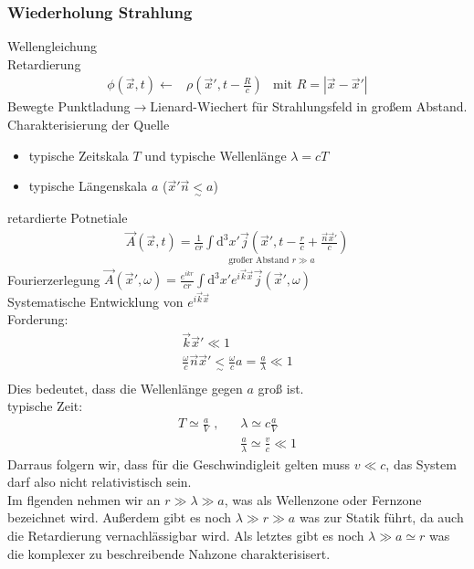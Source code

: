 \documentclass[a4paper]{article}
\newcommand{\intd}{\int\!\mathrm{d}}
\begin{document}
\subsubsection{Wiederholung Strahlung}
Wellengleichung\\
Retardierung
\begin{align}
\phi(\vec{x},t)\longleftarrow&\rho(\vec{x}',t-\frac{R}{c})
&\text{mit }R=|\vec{x}-\vec{x}'| 
\end{align}
Bewegte Punktladung$\rightarrow$Lienard-Wiechert für Strahlungsfeld in großem
Abstand.\\
Charakterisierung der Quelle\\
\begin{itemize}
  \item typische Zeitskala $T$ und typische Wellenlänge $\lambda=cT$
  \item typische Längenskala $a$ ($\vec{x}'\vec{n}\underset{\sim}{<}a$)
\end{itemize}
retardierte Potnetiale
\begin{align}
\vec{A}(\vec{x},t)=\underset{\text{großer Abstand } r\gg a}{
\frac{1}{cr}\intd^3x'
\vec{j}(\vec{x}',t-\frac{r}{c}+\frac{\vec{n}\vec{x}'}{c})} 
\end{align}
Fourierzerlegung
$\vec{A}(\vec{x}',\omega)=\frac{e^{ikr}}{cr}\intd^3x'e^{i\vec{k}\vec{x}}\vec{j}(\vec{x}',\omega)$\\
Systematische Entwicklung von $e^{i\vec{k}\vec{x}}$\\
Forderung: \begin{align}
\vec{k}\vec{x}'\ll1\\
\frac{\omega}{c}\vec{n}\vec{x}'\underset{\sim}{<}\frac{\omega}{c}a=\frac{a}{\lambda}\ll1\\
\end{align}
Dies bedeutet, dass die Wellenlänge gegen $a$ groß ist.\\
typische Zeit:
\begin{align}
T\simeq \frac{a}{V}\text{ , }\ \ \ &\lambda\simeq c\frac{a}{V}\\
&\frac{a}{\lambda}\simeq\frac{v}{c}\ll1
\end{align}
Darraus folgern wir, dass für die Geschwindigleit gelten muss $v\ll c$, das
System darf also nicht relativistisch sein.\\
Im flgenden nehmen wir an $r\gg\lambda\gg a$, was als Wellenzone oder Fernzone
bezeichnet wird. Außerdem gibt es noch $\lambda\gg r\gg a$ was zur Statik führt,
da auch die Retardierung vernachlässigbar wird. Als letztes gibt es noch
$\lambda \gg a \simeq r$ was die komplexer zu beschreibende Nahzone
charakterisisert.\\
\end{document}
